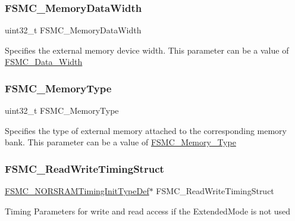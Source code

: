 \subsubsection{\texorpdfstring{FSMC\_MemoryDataWidth}{FSMC\_MemoryDataWidth}}
{\footnotesize\ttfamily uint32\+\_\+t F\+S\+M\+C\+\_\+\+Memory\+Data\+Width}

Specifies the external memory device width. This parameter can be a value of \mbox{\hyperlink{group___f_s_m_c___data___width}{F\+S\+M\+C\+\_\+\+Data\+\_\+\+Width}} \mbox{\label{struct_f_s_m_c___n_o_r_s_r_a_m_init_type_def_ab40afbbbeb92dd80001c6dfbb1f26492}} 
\subsubsection{\texorpdfstring{FSMC\_MemoryType}{FSMC\_MemoryType}}
{\footnotesize\ttfamily uint32\+\_\+t F\+S\+M\+C\+\_\+\+Memory\+Type}

Specifies the type of external memory attached to the corresponding memory bank. This parameter can be a value of \mbox{\hyperlink{group___f_s_m_c___memory___type}{F\+S\+M\+C\+\_\+\+Memory\+\_\+\+Type}} \mbox{\label{struct_f_s_m_c___n_o_r_s_r_a_m_init_type_def_a9d18e112e4c644279e211c4a92dcd9a3}} 
\subsubsection{\texorpdfstring{FSMC\_ReadWriteTimingStruct}{FSMC\_ReadWriteTimingStruct}}
{\footnotesize\ttfamily \mbox{\hyperlink{struct_f_s_m_c___n_o_r_s_r_a_m_timing_init_type_def}{F\+S\+M\+C\+\_\+\+N\+O\+R\+S\+R\+A\+M\+Timing\+Init\+Type\+Def}}$\ast$ F\+S\+M\+C\+\_\+\+Read\+Write\+Timing\+Struct}

Timing Parameters for write and read access if the Extended\+Mode is not used \mbox{\label{struct_f_s_m_c___n_o_r_s_r_a_m_init_type_def_af7faa84a2f52410da02302eb2f48507a}} 
